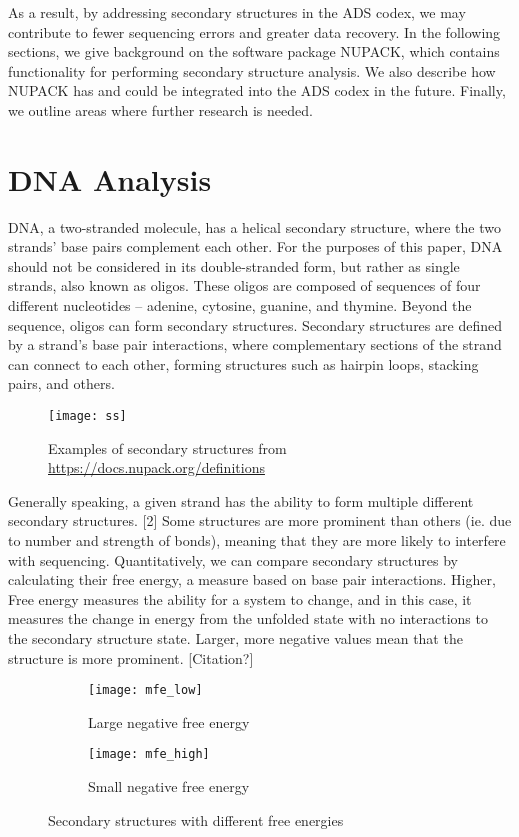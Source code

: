 \documentclass{article}
\begin{document}
As a result, by addressing secondary structures in the ADS codex, we may contribute to fewer sequencing errors and greater data recovery. In the following sections, we give background on the software package NUPACK, which contains functionality for performing secondary structure analysis. We also describe how NUPACK has and could be integrated into the ADS codex in the future. Finally, we outline areas where further research is needed.

\section{DNA Analysis}
DNA, a two-stranded molecule, has a helical secondary structure, where the two strands' base pairs complement each other. For the purposes of this paper, DNA should not be considered in its double-stranded form, but rather as single strands, also known as oligos. These oligos are composed of sequences of four different nucleotides -- adenine, cytosine, guanine, and thymine. Beyond the sequence, oligos can form secondary structures. Secondary structures are defined by a strand's base pair interactions, where complementary sections of the strand can connect to each other, forming structures such as hairpin loops, stacking pairs, and others. 

\begin{figure}[!h]
\centering
\texttt{[image: ss]}
\caption{Examples of secondary structures from \url{https://docs.nupack.org/definitions}}   
\end{figure} 


Generally speaking, a given strand has the ability to form multiple different secondary structures. [2] Some structures are more prominent than others (ie. due to number and strength of bonds), meaning that they are more likely to interfere with sequencing. Quantitatively, we can compare secondary structures by calculating their free energy, a measure based on base pair interactions. Higher, Free energy measures the ability for a system to change, and in this case, it measures the change in energy from the unfolded state with no interactions to the secondary structure state. Larger, more negative values mean that the structure is more prominent. [Citation?]

\begin{figure}
\centering
\begin{subfigure}{.5\textwidth}
  \centering
  \texttt{[image: mfe\_low]}
  \caption{Large negative free energy}
  \label{fig:sub1}
\end{subfigure}%
\begin{subfigure}{.5\textwidth}
  \centering
  \texttt{[image: mfe\_high]}
  \caption{Small negative free energy}
  \label{fig:sub2}
\end{subfigure}
\caption{Secondary structures with different free energies}
\label{fig:test}
\end{figure}
\end{document}
